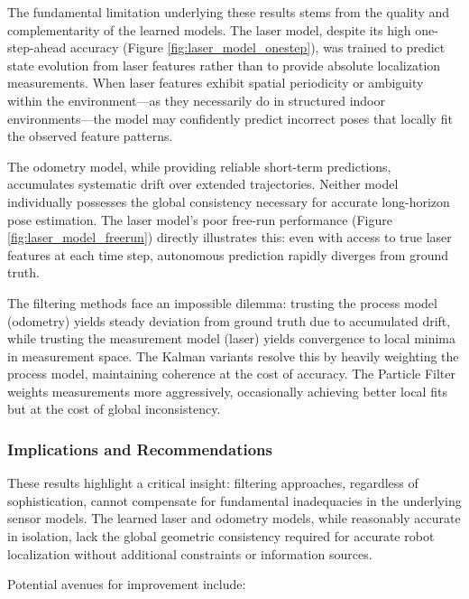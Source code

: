 \documentclass[conference]{IEEEtran}
\begin{document}
The fundamental limitation underlying these results stems from the quality and complementarity of the learned models. The laser model, despite its high one-step-ahead accuracy (Figure \ref{fig:laser_model_onestep}), was trained to predict state evolution from laser features rather than to provide absolute localization measurements. When laser features exhibit spatial periodicity or ambiguity within the environment—as they necessarily do in structured indoor environments—the model may confidently predict incorrect poses that locally fit the observed feature patterns.

The odometry model, while providing reliable short-term predictions, accumulates systematic drift over extended trajectories. Neither model individually possesses the global consistency necessary for accurate long-horizon pose estimation. The laser model's poor free-run performance (Figure \ref{fig:laser_model_freerun}) directly illustrates this: even with access to true laser features at each time step, autonomous prediction rapidly diverges from ground truth.

The filtering methods face an impossible dilemma: trusting the process model (odometry) yields steady deviation from ground truth due to accumulated drift, while trusting the measurement model (laser) yields convergence to local minima in measurement space. The Kalman variants resolve this by heavily weighting the process model, maintaining coherence at the cost of accuracy. The Particle Filter weights measurements more aggressively, occasionally achieving better local fits but at the cost of global inconsistency.

\subsubsection{Implications and Recommendations}

These results highlight a critical insight: filtering approaches, regardless of sophistication, cannot compensate for fundamental inadequacies in the underlying sensor models. The learned laser and odometry models, while reasonably accurate in isolation, lack the global geometric consistency required for accurate robot localization without additional constraints or information sources.

Potential avenues for improvement include:
\end{document}
